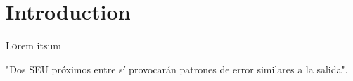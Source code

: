 \chapter{Introduction}
\label{ch:Introduction}





\lettrine[lraise=-0.1, lines=2, loversize=0.2]{L}{o}rem itsum

\begin{hypothesis}\label{hyp:inicial}
    "Dos \gls{SEU} próximos entre sí provocarán patrones de error similares a la 
    salida".
\end{hypothesis}

\endinput
